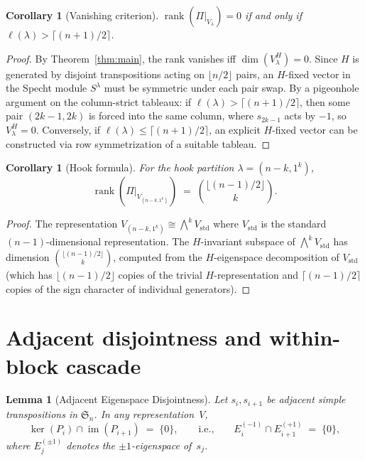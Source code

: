\documentclass[11pt]{article}
\newtheorem{lemma}[theorem]{Lemma}
\newtheorem{corollary}[theorem]{Corollary}
\theoremstyle{definition}
\theoremstyle{remark}
\newcommand{\Sym}{\mathfrak{S}}
\newcommand{\im}{\operatorname{im}}
\newcommand{\rk}{\operatorname{rank}}
\begin{document}
\begin{corollary}[Vanishing criterion]\label{cor:vanishing}
$\rk(\Pi|_{V_\lambda}) = 0$ if and only if
$\ell(\lambda) > \lceil (n+1)/2 \rceil$.
\end{corollary}
\begin{proof}
By Theorem~\ref{thm:main}, the rank vanishes iff $\dim(V_\lambda^H) = 0$.
Since $H$ is generated by disjoint transpositions acting on
$\lfloor n/2 \rfloor$ pairs, an $H$-fixed vector in the Specht module
$S^\lambda$ must be symmetric under each pair swap. By a pigeonhole
argument on the column-strict tableaux: if $\ell(\lambda) > \lceil(n+1)/2\rceil$,
then some pair $(2k-1, 2k)$ is forced into the same column, where $s_{2k-1}$
acts by $-1$, so $V_\lambda^H = 0$. Conversely, if
$\ell(\lambda) \le \lceil (n+1)/2 \rceil$, an explicit $H$-fixed vector
can be constructed via row symmetrization of a suitable tableau.
\end{proof}

\begin{corollary}[Hook formula]\label{cor:hook}
For the hook partition $\lambda = (n-k, 1^k)$,
\[
  \rk(\Pi|_{V_{(n-k,1^k)}}) \;=\; \binom{\lfloor (n-1)/2 \rfloor}{k}.
\]
\end{corollary}
\begin{proof}
The representation $V_{(n-k,1^k)} \cong \bigwedge^k V_{\mathrm{std}}$
where $V_{\mathrm{std}}$ is the standard $(n-1)$-dimensional representation.
The $H$-invariant subspace of $\bigwedge^k V_{\mathrm{std}}$ has dimension
$\binom{\lfloor(n-1)/2\rfloor}{k}$, computed from the $H$-eigenspace
decomposition of $V_{\mathrm{std}}$ (which has $\lfloor(n-1)/2\rfloor$
copies of the trivial $H$-representation and
$\lceil(n-1)/2\rceil$ copies of the sign character of individual
generators).
\end{proof}


\section{Adjacent disjointness and within-block cascade}\label{sec:adjacent}

\begin{lemma}[Adjacent Eigenspace Disjointness]\label{lem:adjacent}
Let $s_i, s_{i+1}$ be adjacent simple transpositions in $\Sym_n$.
In any representation~$V$,
\[
  \ker(P_i) \cap \im(P_{i+1}) \;=\; \{0\},
  \qquad\text{i.e.,}\qquad
  E_i^{(-1)} \cap E_{i+1}^{(+1)} \;=\; \{0\},
\]
where $E_j^{(\pm 1)}$ denotes the $\pm 1$-eigenspace of~$s_j$.
\end{lemma}
\end{document}
